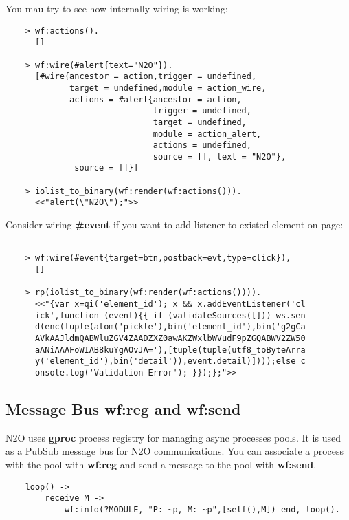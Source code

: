 You mau try to see how internally wiring is working:

\begin{lstlisting}
    > wf:actions().
      []

    > wf:wire(#alert{text="N2O"}).
      [#wire{ancestor = action,trigger = undefined,
             target = undefined,module = action_wire,
             actions = #alert{ancestor = action,
                              trigger = undefined,
                              target = undefined,
                              module = action_alert,
                              actions = undefined,
                              source = [], text = "N2O"},
              source = []}]

    > iolist_to_binary(wf:render(wf:actions())).
      <<"alert(\"N2O\");">>
\end{lstlisting}

Consider wiring {\bf \#event} if you want to add listener to
existed element on page:

\vspace{1\baselineskip}
\begin{lstlisting}

    > wf:wire(#event{target=btn,postback=evt,type=click}),
      []

    > rp(iolist_to_binary(wf:render(wf:actions()))).
      <<"{var x=qi('element_id'); x && x.addEventListener('cl
      ick',function (event){{ if (validateSources([])) ws.sen
      d(enc(tuple(atom('pickle'),bin('element_id'),bin('g2gCa
      AVkAAJldmQABWluZGV4ZAADZXZ0awAKZWxlbWVudF9pZGQABWV2ZW50
      aANiAAAFoWIAB8kuYgAOvJA='),[tuple(tuple(utf8_toByteArra
      y('element_id'),bin('detail')),event.detail)])));else c
      onsole.log('Validation Error'); }});};">>
\end{lstlisting}


\newpage
\subsection{Message Bus {\bf wf:reg} and {\bf wf:send}}
N2O uses {\bf gproc} process registry for managing async processes pools.
It is used as a PubSub message bus for N2O communications.
You can associate a process with the pool with {\bf wf:reg}
and send a message to the pool with {\bf wf:send}.

\vspace{1\baselineskip}
\begin{lstlisting}
    loop() ->
        receive M ->
            wf:info(?MODULE, "P: ~p, M: ~p",[self(),M]) end, loop().
\end{lstlisting}


